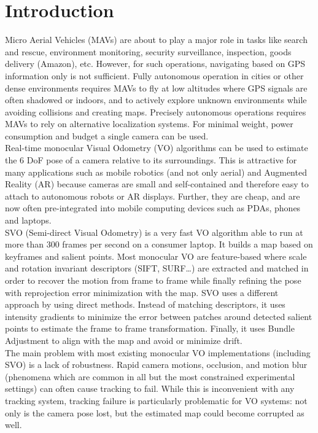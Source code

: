 \chapter{Introduction}\label{sec:introduction}
Micro Aerial Vehicles (MAVs) are about to play a major role in tasks like search and rescue, environment monitoring, security surveillance, inspection, goods delivery (Amazon), etc.  However, for such operations, navigating based on GPS information only is not sufficient. Fully autonomous operation in cities or other dense environments requires MAVs to fly at low altitudes where GPS signals are often shadowed or indoors, and to actively explore unknown environments while avoiding collisions and creating maps. Precisely autonomous operations requires MAVs to rely on alternative localization systems. For minimal weight, power consumption and budget a single camera can be used.\\

Real-time monocular Visual Odometry (VO) algorithms can be used to estimate the 6 DoF pose of a camera relative to its surroundings. This is attractive for many applications such as mobile robotics (and not only aerial) and Augmented Reality (AR) because cameras are small and self-contained and therefore easy to attach to autonomous robots or AR displays. Further, they are cheap, and are now often pre-integrated into mobile computing devices such as PDAs, phones and laptops.\\

SVO (Semi-direct Visual Odometry) \cite{Forster2014} is a very fast VO algorithm able to run at more than 300 frames per second on a consumer laptop. It builds a map based on keyframes and salient points. Most monocular VO are feature-based where scale and rotation invariant descriptors (SIFT, SURF\ldots) are extracted and matched in order to recover the motion from frame to frame while finally refining the pose with reprojection error minimization with the map. SVO uses a different approach by using direct methods. Instead of matching descriptors, it uses intensity gradients to minimize the error between patches around detected salient points to estimate the frame to frame transformation. Finally, it uses Bundle Adjustment to align with the map and avoid or minimize drift.\\

The main problem with most existing monocular VO implementations (including SVO) is a lack of robustness. Rapid camera motions, occlusion, and motion blur (phenomena which are common in all but the most constrained experimental settings) can often cause tracking to fail. While this is inconvenient with any tracking system, tracking failure is particularly problematic for VO systems: not only is the camera pose lost, but the estimated map could become corrupted as well. \\

